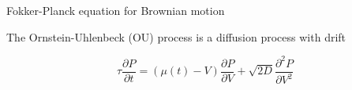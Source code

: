 \documentclass[aspectratio=169]{beamer}
\begin{document}
\begin{frame}{Fokker-Planck equation for Brownian motion}

\begin{figure}
\centering
{}
\end{figure}

The Ornstein-Uhlenbeck (OU) process is a diffusion process with drift

\begin{equation*}
\tau\frac{\partial P}{\partial t} = (\mu(t)-V)\frac{\partial P}{\partial V} + \sqrt{2D}\frac{\partial^{2}P}{\partial V^{2}}
\end{equation*}

\end{frame}
\end{document}
